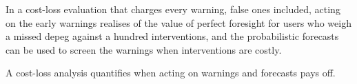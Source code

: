 %
%


In a cost-loss evaluation that charges every warning, false ones included, acting on the early warnings
realises \clHoVa{} of the value of perfect foresight for users who weigh a missed depeg against a hundred
interventions, and the probabilistic forecasts can be used to screen the warnings when interventions are
costly.


\item A cost-loss analysis quantifies when acting on warnings and forecasts pays off.


